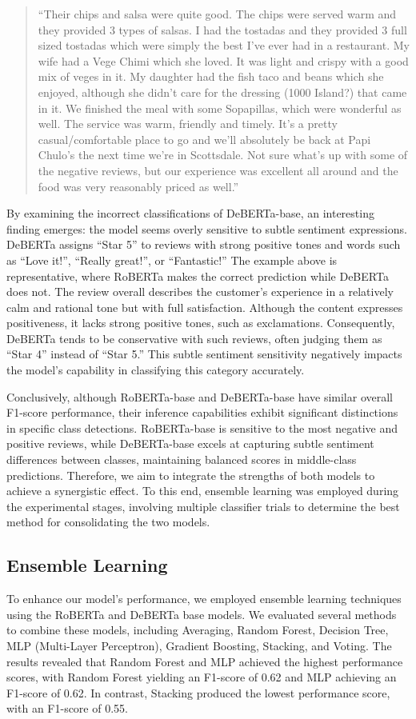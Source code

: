 \documentclass[12pt]{article}
\begin{document}
\begin{quote}“Their chips and salsa were quite good. The chips were served warm and they provided 3 types of salsas. I had the tostadas and they provided 3 full sized tostadas which were simply the best I've ever had in a restaurant.  My wife had a Vege Chimi which she loved.  It was light and crispy with a good mix of veges in it.  My daughter had the fish taco and beans which she enjoyed, although she didn't care for the dressing (1000 Island?) that came in it.  We finished the meal with some Sopapillas, which were wonderful as well. The service was warm, friendly and timely.  It's a pretty casual/comfortable place to go and we'll absolutely be back at Papi Chulo's the next time we're in Scottsdale. Not sure what's up with some of the negative reviews, but our experience was excellent all around and the food was very reasonably priced as well.”
\end{quote}

By examining the incorrect classifications of DeBERTa-base, an interesting finding emerges: the model seems overly sensitive to subtle sentiment expressions. DeBERTa assigns “Star 5” to reviews with strong positive tones and words such as “Love it!”, “Really great!”, or “Fantastic!” The example above is representative, where RoBERTa makes the correct prediction while DeBERTa does not. The review overall describes the customer’s experience in a relatively calm and rational tone but with full satisfaction. Although the content expresses positiveness, it lacks strong positive tones, such as exclamations. Consequently, DeBERTa tends to be conservative with such reviews, often judging them as “Star 4” instead of “Star 5.” This subtle sentiment sensitivity negatively impacts the model’s capability in classifying this category accurately.

Conclusively, although RoBERTa-base and DeBERTa-base have similar overall F1-score performance, their inference capabilities exhibit significant distinctions in specific class detections. RoBERTa-base is sensitive to the most negative and positive reviews, while DeBERTa-base excels at capturing subtle sentiment differences between classes, maintaining balanced scores in middle-class predictions. Therefore, we aim to integrate the strengths of both models to achieve a synergistic effect. To this end, ensemble learning was employed during the experimental stages, involving multiple classifier trials to determine the best method for consolidating the two models.

\subsection{Ensemble Learning}
To enhance our model's performance, we employed ensemble learning techniques using the RoBERTa and DeBERTa base models. We evaluated several methods to combine these models, including Averaging, Random Forest, Decision Tree, MLP (Multi-Layer Perceptron), Gradient Boosting, Stacking, and Voting. The results revealed that Random Forest and MLP achieved the highest performance scores, with Random Forest yielding an F1-score of 0.62 and MLP achieving an F1-score of 0.62. In contrast, Stacking produced the lowest performance score, with an F1-score of 0.55.
\end{document}
